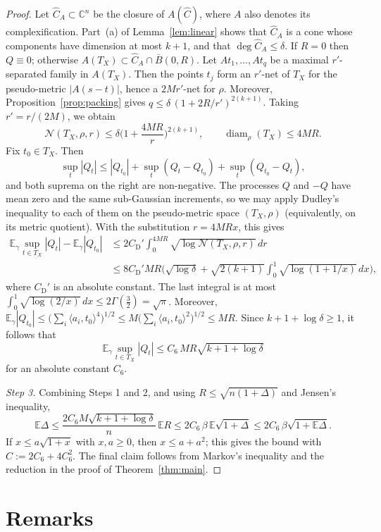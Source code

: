 \documentclass[11pt]{article}
\theoremstyle{definition}
\numberwithin{equation}{section}
\newcommand{\C}{\mathbb{C}}
\newcommand{\E}{\mathbb{E}}
\newcommand{\Ch}{\widehat{C}}
\newcommand{\cN}{\mathcal{N}}
\DeclareMathOperator{\diam}{diam}
\newcommand{\CD}{C_{\mathrm{D}}}
\begin{document}
\begin{proof}
Let $\Ch_A\subset\C^n$ be the closure of $A(\Ch)$, where $A$ also denotes its complexification. Part~(a) of Lemma~\ref{lem:linear} shows that $\Ch_A$ is a cone whose components have dimension at most $k+1$, and that $\deg\Ch_A\le\delta$. If $R=0$ then $Q\equiv0$; otherwise $A(T_X)\subset\Ch_A\cap\bar B(0,R)$. Let $At_1,\dots,At_q$ be a maximal $r'$-separated family in $A(T_X)$. Then the points $t_j$ form an $r'$-net of $T_X$ for the pseudo-metric $|A(s-t)|$, hence a $2Mr'$-net for $\rho$. Moreover, Proposition~\ref{prop:packing} gives $q\le\delta\,(1+2R/r')^{2(k+1)}$. Taking $r'=r/(2M)$, we obtain
\[
\cN(T_X,\rho,r)\le\delta\Big(1+\frac{4MR}{r}\Big)^{2(k+1)},\qquad\diam_\rho(T_X)\le4MR .
\]
Fix $t_0\in T_X$. Then
\[
\sup_t|Q_t|\le|Q_{t_0}|+\sup_t(Q_t-Q_{t_0})+\sup_t(Q_{t_0}-Q_t),
\]
and both suprema on the right are non-negative. The processes $Q$ and $-Q$ have mean zero and the same sub-Gaussian increments, so we may apply Dudley's inequality \cite[Thm.~8.1.3]{Vershynin} to each of them on the pseudo-metric space $(T_X,\rho)$ (equivalently, on its metric quotient). With the substitution $r=4MRx$, this gives
\begin{align*}
\E_\gamma\sup_{t\in T_X}|Q_t|-\E_\gamma|Q_{t_0}|
&\le2\CD'\int_0^{4MR}\sqrt{\log\cN(T_X,\rho,r)}\,dr\\
&\le8\CD'MR\Big(\sqrt{\log\delta}+\sqrt{2(k+1)}\int_0^1\sqrt{\log(1+1/x)}\,dx\Big),
\end{align*}
where $\CD'$ is an absolute constant. The last integral is at most $\int_0^1\sqrt{\log(2/x)}\,dx\le2\Gamma(\tfrac32)=\sqrt\pi$. Moreover, $\E_\gamma|Q_{t_0}|\le\big(\sum_i\langle a_i,t_0\rangle^4\big)^{1/2}\le M\big(\sum_i\langle a_i,t_0\rangle^2\big)^{1/2}\le MR$. Since $k+1+\log\delta\ge1$, it follows that
\[
\E_\gamma\sup_{t\in T_X}|Q_t|\le C_6\,MR\sqrt{k+1+\log\delta}
\]
for an absolute constant $C_6$.

\emph{Step 3.} Combining Steps 1 and 2, and using $R\le\sqrt{n(1+\Delta)}$ and Jensen's inequality,
\[
\E\Delta\le\frac{2C_6M\sqrt{k+1+\log\delta}}{n}\,\E R\le2C_6\,\beta\,\E\sqrt{1+\Delta}\le2C_6\,\beta\sqrt{1+\E\Delta}.
\]
If $x\le a\sqrt{1+x}$ with $x,a\ge0$, then $x\le a+a^2$; this gives the bound with $C:=2C_6+4C_6^2$. The final claim follows from Markov's inequality and the reduction in the proof of Theorem~\ref{thm:main}.
\end{proof}

\section{Remarks}\label{sec:remarks}
\end{document}
